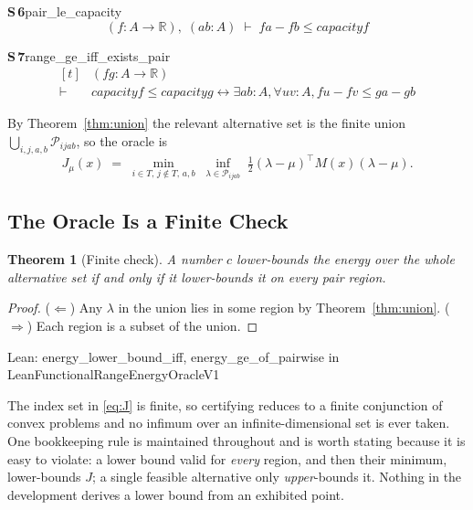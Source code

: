 \documentclass[conference]{IEEEtran}
\newtheorem{theorem}{Theorem}
\theoremstyle{definition}
\newcommand{\lean}[1]{\textsf{\footnotesize #1}}
\newcommand{\leanbox}[1]{%
  \par\vspace{2pt}\noindent
  {\footnotesize\textsf{Lean: #1}}\par\vspace{2pt}}
\begin{document}
\noindent\textbf{S\,6}\quad\lean{pair\_le\_capacity}
{\footnotesize\[ (\mathit{f} : \mathit{A} \to \mathbb{R} ),\; (\mathit{a} \mathit{b} : \mathit{A}) \;\vdash\; \mathit{f} \mathit{a} - \mathit{f} \mathit{b} \leq \mathit{capacity} \mathit{f} \]}

\noindent\textbf{S\,7}\quad\lean{range\_ge\_iff\_exists\_pair}
{\footnotesize\[ \begin{aligned}[t]
&(\mathit{f} \mathit{g} : \mathit{A} \to \mathbb{R} )\\
\vdash\;&\mathit{capacity} \mathit{f} \leq \mathit{capacity} \mathit{g} \leftrightarrow \exists \mathit{a} \mathit{b} : \mathit{A}, \forall \mathit{u} \mathit{v} : \mathit{A}, \mathit{f} \mathit{u} - \mathit{f} \mathit{v} \leq \mathit{g} \mathit{a} - \mathit{g} \mathit{b}
\end{aligned} \]}


By Theorem~\ref{thm:union} the relevant alternative set is the finite union
$\bigcup_{i,j,a,b}\mathcal{P}_{ijab}$, so the oracle is
\begin{equation}
J_\mu(x)\;=\;\min_{i\in T,\,j\notin T,\,a,b}\;
\inf_{\lambda\in\mathcal{P}_{ijab}}\;
\tfrac{1}{2}(\lambda-\mu)^{\top}M(x)(\lambda-\mu).
\label{eq:J}
\end{equation}

\subsection{The Oracle Is a Finite Check}
\label{sec:oracle}

\begin{theorem}[Finite check]
\label{thm:oracle}
A number $c$ lower-bounds the energy over the whole alternative set if and only if it
lower-bounds it on every pair region.
\end{theorem}

\begin{proof}
($\Leftarrow$) Any $\lambda$ in the union lies in some region by Theorem~\ref{thm:union}.
($\Rightarrow$) Each region is a subset of the union.
\end{proof}

\leanbox{\lean{energy\_lower\_bound\_iff}, \lean{energy\_ge\_of\_pairwise} in
\lean{LeanFunctionalRangeEnergyOracleV1}}

The index set in \eqref{eq:J} is finite, so certifying reduces to a finite conjunction of
convex problems and no infimum over an infinite-dimensional set is ever taken. One
bookkeeping rule is maintained throughout and is worth stating because it is easy to violate:
a lower bound valid for \emph{every} region, and then their minimum, lower-bounds $J$; a
single feasible alternative only \emph{upper}-bounds it. Nothing in the development derives a
lower bound from an exhibited point.
\end{document}
